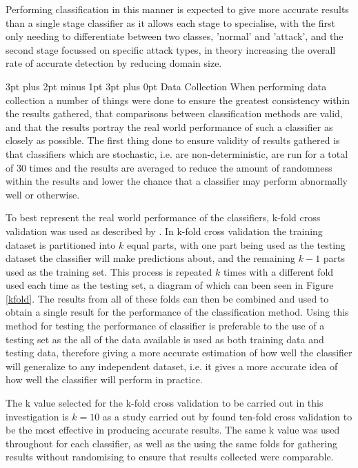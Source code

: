 \documentclass[12pt,a4paper]{article}
\makeatletter
\renewcommand\subsection{\@startsection {subsection}{1}{2mm} %
      {3pt plus 2pt minus 1pt} %
      {3pt plus 0pt} %
      {\normalfont\bfseries}}
\makeatother
\begin{document}
	Performing classification in this manner is expected to give more accurate results than a single stage classifier as it allows each stage to specialise, with the first only needing to differentiate between two classes, 'normal' and 'attack', and the second stage focussed on specific attack types, in theory increasing the overall rate of accurate detection by reducing domain size.

\subsection{Data Collection}
When performing data collection a number of things were done to ensure the greatest consistency within the results gathered, that comparisons between classification methods are valid, and that the results portray the real world performance of such a classifier as closely as possible. The first thing done to ensure validity of results gathered is that classifiers which are stochastic, i.e. are non-deterministic, are run for a total of 30 times and the results are averaged to reduce the amount of randomness within the results and lower the chance that a classifier may perform abnormally well or otherwise.

	

To best represent the real world performance of the classifiers, k-fold cross validation was used as described by \cite{refaeilzadeh2009cross}. In k-fold cross validation the training dataset is partitioned into $ k $ equal parts, with one part being used as the testing dataset the classifier will make predictions about, and the remaining $ k-1 $ parts used as the training set. This process is repeated $ k $ times with a different fold used each time as the testing set, a diagram of which can been seen in Figure \ref{kfold}. The results from all of these folds can then be combined and used to obtain a single result for the performance of the classification method. Using this method for testing the performance of classifier is preferable to the use of a testing set as the all of the data available is used as both training data and testing data, therefore giving a more accurate estimation of how well the classifier will generalize to any independent dataset, i.e. it gives a more accurate idea of how well the classifier will perform in practice.

The k value selected for the k-fold cross validation to be carried out in this investigation is $ k=10 $ as a study carried out by \cite{kohavi1995study} found ten-fold cross validation to be the most effective in producing accurate results. The same k value was used throughout for each classifier, as well as the using the same folds for gathering results without randomising to ensure that results collected were comparable.
\end{document}
